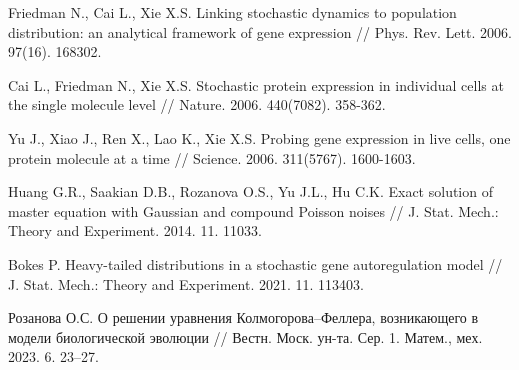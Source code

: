 \begin{thebibliography}{9} %
 Friedman N., Cai L., Xie X.S. Linking stochastic dynamics to population distribution: an analytical framework of gene expression // Phys. Rev. Lett. 2006. 97(16). 168302.

 Cai L., Friedman N., Xie X.S. Stochastic protein expression in individual cells at the single molecule level // Nature. 2006. 440(7082). 358-362.

 Yu J., Xiao J., Ren X., Lao K., Xie X.S. Probing gene expression in live cells, one protein molecule at a time // Science. 2006. 311(5767). 1600-1603.

 Huang G.R., Saakian D.B., Rozanova O.S., Yu J.L., Hu C.K. Exact solution of master equation with Gaussian
and compound Poisson noises // J. Stat. Mech.: Theory and Experiment. 2014. 11. 11033.

 Bokes P. Heavy-tailed distributions in a stochastic gene autoregulation \newline model // J. Stat. Mech.: Theory and
Experiment. 2021. 11. 113403.

 Розанова О.С. О решении уравнения Колмогорова–Феллера, возникающего в модели биологической эволюции // Вестн.
Моск. ун-та. Сер. 1. Матем., мех. 2023. 6. 23–27.

\end{thebibliography}




%

